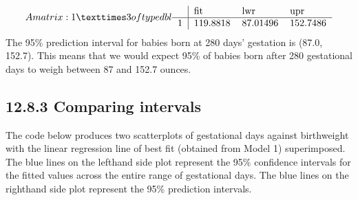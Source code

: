 \documentclass[letterpaper,10pt,english]{jupyterBook}
\begin{document}
\begin{sphinxVerbatim}[commandchars=\\\{\}]
   
\end{sphinxVerbatim}
\begin{equation*}
\begin{split}A matrix: 1 × 3 of type dbl
\begin{tabular}{r|lll}
  & fit & lwr & upr\\
\hline
	1 & 119.8818 & 87.01496 & 152.7486\\
\end{tabular}\end{split}
\end{equation*}
\sphinxAtStartPar
The 95\% prediction interval for babies born at 280 days’ gestation is (87.0, 152.7). This means that we would expect 95\% of babies born after 280 gestational days to weigh between 87 and 152.7 ounces.


\subsection{12.8.3 Comparing intervals}
\label{\detokenize{12.i. Linear Regression I:comparing-intervals}}
\sphinxAtStartPar
The code below produces two scatterplots of gestational days against birthweight with the linear regression line of best fit (obtained from Model 1) superimposed. The blue lines on the left\sphinxhyphen{}hand side plot represent the 95\% confidence intervals for the fitted values across the entire range of gestational days. The blue lines on the right\sphinxhyphen{}hand side plot represent the 95\% prediction intervals.
\end{document}

